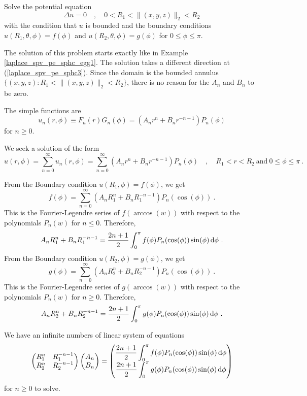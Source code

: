 \begin{egg}
Solve the potential equation
\[
\Delta u = 0 \quad , \quad 0< R_1 < \|(x,y,z)\|_2 < R_2
\]
with the condition that $u$ is bounded and the boundary
conditions $u(R_1,\theta, \phi) = f(\phi)$ and
$u(R_2,\theta, \phi) = g(\phi)$ for $0 \leq \phi \leq \pi$.

The solution of this problem starts exactly like in Example
\ref{laplace_spv_pe_sphc_egg1}.  The solution takes a different direction at
(\ref{laplace_spv_pe_sphc3}).  Since the domain is the bounded annulus
$\{ (x,y,z) : R_1 < \|(x,y,z)\|_2 < R_2 \}$, there is no reason for the
$A_n$ and $B_n$ to be zero.

The simple functions are
\[
u_n(r,\phi) \equiv F_n(r)G_n(\phi) = \left(A_n r^n + B_n r^{-n-1}\right)
P_n(\phi)
\]
for $n \geq 0$.

We seek a solution of the form
\[
u(r,\phi) = \sum_{n=0}^\infty u_n(r,\phi)
= \sum_{n=0}^\infty \left(A_n r^n + B_n r^{-n-1}\right) P_n(\phi)
\quad , \quad R_1 < r < R_2 \ \text{and} \ 0 \leq \phi \leq \pi \ .
\]

From the Boundary condition $u(R_1,\phi) = f(\phi)$, we get
\[
f(\phi) = \sum_{n=0}^\infty \left(A_n R_1^n + B_n R_1^{-n-1}\right)
P_n(\cos(\phi)) \ .
\]
This is the Fourier-Legendre series of $f(\arccos(w))$ with respect to
the polynomials $P_n(w)$ for $n\leq 0$.
Therefore,
\[
A_n R_1^n + B_n R_1^{-n-1} =
\frac{2n+1}{2} \int_0^\pi f(\phi) P_n(\cos(\phi)) \sin(\phi) \dx{\phi} \ .
\]
From the Boundary condition $u(R_2,\phi) = g(\phi)$, we get
\[
g(\phi) = \sum_{n=0}^\infty \left(A_n R_2^n + B_n R_2^{-n-1}\right)
P_n(\cos(\phi)) \ .
\]
This is the Fourier-Legendre series of $g(\arccos(w))$ with respect to
the polynomials $P_n(w)$ for $n \geq 0$.
Therefore,
\[
A_n R_2^n + B_n R_2^{-n-1} =
\frac{2n+1}{2} \int_0^\pi g(\phi) P_n(\cos(\phi)) \sin(\phi) \dx{\phi} \ .
\]

We have an infinite numbers of linear system of equations
\[
\begin{pmatrix}
R_1^n & R_1^{-n-1} \\
R_2^n & R_2^{-n-1}
\end{pmatrix}
\begin{pmatrix}
A_n \\ B_n
\end{pmatrix}
=
\begin{pmatrix}
\displaystyle
\frac{2n+1}{2} \int_0^\pi f(\phi) P_n(\cos(\phi)) \sin(\phi) \,\mathrm{d}{\phi}
\\[0.6em]
\displaystyle
\frac{2n+1}{2} \int_0^\pi g(\phi) P_n(\cos(\phi)) \sin(\phi) \,\mathrm{d}{\phi}
\end{pmatrix}
\]
for $n\geq 0$ to solve.
\end{egg}

